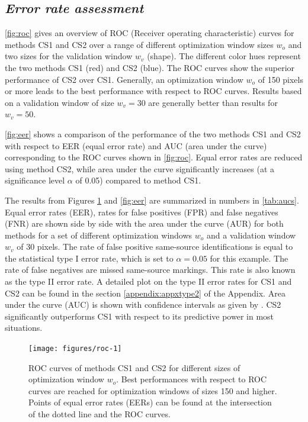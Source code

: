 \documentclass[12pt]{article}
\begin{document}
\hypertarget{error-rate-assessment}{%
\subsection*{\texorpdfstring{\emph{Error rate
assessment}}{Error rate assessment}}\label{error-rate-assessment}}

\autoref{fig:roc} gives an overview of ROC (Receiver operating
characteristic) curves for methods CS1 and CS2 over a range of different
optimization window sizes \(w_o\) and two sizes for the validation
window \(w_v\) (shape). The different color hues represent the two
methods CS1 (red) and CS2 (blue). The ROC curves show the superior
performance of CS2 over CS1. Generally, an optimization window \(w_o\)
of 150 pixels or more leads to the best performance with respect to ROC
curves. Results based on a validation window of size \(w_v = 30\) are
generally better than results for \(w_v = 50\).

\autoref{fig:eer} shows a comparison of the performance of the two
methods CS1 and CS2 with respect to EER (equal error rate) and AUC (area
under the curve) corresponding to the ROC curves shown in
\autoref{fig:roc}. Equal error rates are reduced using method CS2, while
area under the curve significantly increases (at a significance level
\(\alpha\) of 0.05) compared to method CS1.

The results from Figures \ref{fig:roc} and \ref{fig:eer} are summarized
in numbers in \autoref{tab:aucs}. Equal error rates (EER), rates for
false positives (FPR) and false negatives (FNR) are shown side by side
with the area under the curve (AUR) for both methods for a set of
different optimization windows \(w_o\) and a validation window \(w_v\)
of 30 pixels. The rate of false positive same-source identifications is
equal to the statistical type I error rate, which is set to
\(\alpha = 0.05\) for this example. The rate of false negatives are
missed same-source markings. This rate is also known as the type II
error rate. A detailed plot on the type II error rates for CS1 and CS2
can be found in the section \ref{appendix:appxtype2} of the Appendix.
Area under the curve (AUC) is shown with confidence intervals as given
by \citet{delong}. CS2 significantly outperforms CS1 with respect to its
predictive power in most situations.

\begin{figure}

{\centering \texttt{[image: figures/roc-1]} 

}

\caption{ROC curves of methods CS1 and CS2 for different sizes of optimization window $w_o$. Best performances with respect to  ROC curves are reached for optimization windows of sizes 150 and higher. Points of equal error rates (EERs) can be found at the intersection of the dotted line and the ROC curves.}\label{fig:roc}
\end{figure}
\end{document}
